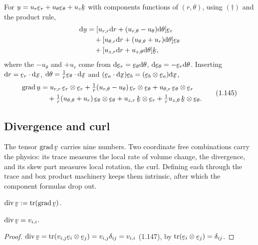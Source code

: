 \begin{example}\label{ex:gupolar}
For $\bu=u_r\ber+u_\theta\beth+u_z\bk$ with components functions of
$(r,\theta)$, using $(\dagger)$ and the product rule,
\[
\begin{aligned}
\dl\bu&=[u_{r,r}\dl r+(u_{r,\theta}-u_\theta)\dl\theta]\ber\\
&\quad+[u_{\theta,r}\dl r+(u_{\theta,\theta}+u_r)\dl\theta]\beth\\
&\quad+[u_{z,r}\dl r+u_{z,\theta}\dl\theta]\bk,
\end{aligned}
\]
where the $-u_\theta$ and $+u_r$ come from
$\dl\ber=\beth\dl\theta$, $\dl\beth=-\ber\dl\theta$. Inserting
$\dl r=\ber\cdot\dl\bx$, $\dl\theta=\tfrac1r\beth\cdot\dl\bx$ and
$(\be_a\cdot\dl\bx)\be_b=(\be_b\otimes\be_a)\dl\bx$,
\begin{equation}
\begin{aligned}
\grad\bu&=u_{r,r}\,\ber\otimes\ber
+\tfrac1r(u_{r,\theta}-u_\theta)\,\ber\otimes\beth
+u_{\theta,r}\,\beth\otimes\ber\\
&\quad+\tfrac1r(u_{\theta,\theta}+u_r)\,\beth\otimes\beth
+u_{z,r}\,\bk\otimes\ber+\tfrac1r u_{z,\theta}\,\bk\otimes\beth.
\end{aligned}\tag{1.145}\label{eq:1.145}
\end{equation}
\end{example}

\subsection{Divergence and curl}\label{ss:divcurl}

The tensor $\grad\bv$ carries nine numbers. Two coordinate free
combinations carry the physics: its trace measures the local rate of volume
change, the divergence, and its skew part measures local rotation, the
curl. Defining each through the trace and box product machinery keeps them
intrinsic, after which the component formulas drop out.

\begin{definition}\label{def:divv}
$\dvg\bv:=\tr(\grad\bv)$.
\end{definition}

\begin{proposition}\label{prop:divv}
$\dvg\bv=v_{i,i}$.
\end{proposition}

\begin{proof}
$\dvg\bv=\tr(v_{i,j}\be_i\otimes\be_j)=v_{i,j}\dd_{ij}=v_{i,i}$ (1.147), by
$\tr(\be_i\otimes\be_j)=\dd_{ij}$.
\end{proof}

